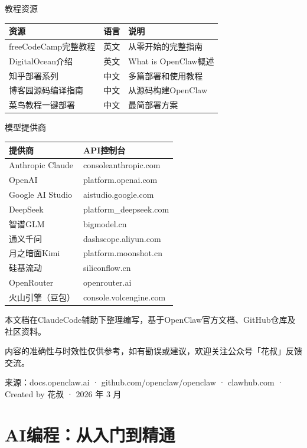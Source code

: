 \documentclass[
  10
]{article}
\newcounter{none} %
\begin{document}
教程资源

{\def\LTcaptype{none} %
\begin{longtable}[]{@{}|l|l|l|@{}}
\toprule\noalign{}
\endhead
\bottomrule\noalign{}
\endlastfoot
\hline
资源 & 语言 & 说明 \\
\hline
freeCodeCamp完整教程 & 英文 & 从零开始的完整指南 \\
\hline
DigitalOcean介绍 & 英文 & What is OpenClaw概述 \\
\hline
知乎部署系列 & 中文 & 多篇部署和使用教程 \\
\hline
博客园源码编译指南 & 中文 & 从源码构建OpenClaw \\
\hline
菜鸟教程一键部署 & 中文 & 最简部署方案 \\
\hline
\end{longtable}
}

模型提供商

{\def\LTcaptype{none} %
\begin{longtable}[]{@{}|l|l|@{}}
\toprule\noalign{}
\endhead
\bottomrule\noalign{}
\endlastfoot
\hline
提供商 & API控制台 \\
\hline
Anthropic Claude & consoleanthropic.com \\
\hline
OpenAI & platform.openai.com \\
\hline
Google AI Studio & aistudio.google.com \\
\hline
DeepSeek & platform\_deepseek.com \\
\hline
智谱GLM & bigmodel.cn \\
\hline
通义千问 & dashscope.aliyun.com \\
\hline
月之暗面Kimi & platform.moonshot.cn \\
\hline
硅基流动 & siliconflow.cn \\
\hline
OpenRouter & openrouter.ai \\
\hline
火山引擎（豆包） & console.volcengine.com \\
\hline
\end{longtable}
}

本文档在ClaudeCode辅助下整理编写，基于OpenClaw官方文档、GitHub仓库及社区资料。

内容的准确性与时效性仅供参考，如有勘误或建议，欢迎关注公众号「花叔」反馈交流。

来源：docs.openclaw.ai · github.com/openclaw/openclaw · clawhub.com ·
Created by 花叔 · 2026 年 3 月

\section{AI编程：从入门到精通}\label{aiux7f16ux7a0bux4eceux5165ux95e8ux5230ux7cbeux901a}
\end{document}
